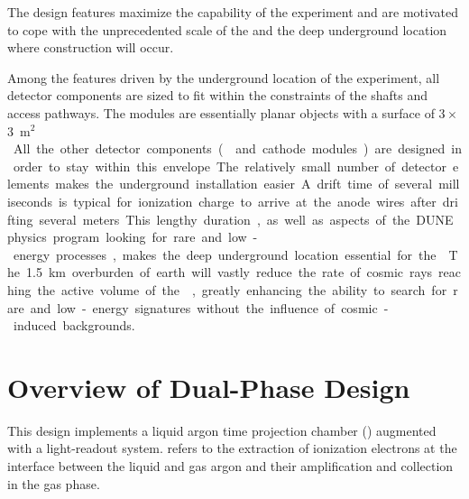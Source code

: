 The \dual design features maximize the capability of the experiment and are motivated to cope with the unprecedented scale of the  and the deep underground location where construction will occur.

Among the features driven by the underground location of the experiment, all detector components are sized to fit within the constraints of the \surf shafts and access pathways. The  modules are essentially planar objects with a surface of \num{3}\,$\times$\,\SI{3}{m$^2$}. All the other detector 
components ( and cathode modules) are  designed in order to stay within this envelope. The relatively small number of detector elements makes the underground installation easier.

A drift time of several milliseconds is typical for ionization charge to arrive at the anode wires after drifting several meters.  This lengthy duration, as well as aspects of the DUNE physics program looking for rare and low-energy processes, makes the deep underground location essential for the .  The \SI{1.5}{km} overburden of earth will vastly reduce the rate of cosmic rays reaching the active volume of the , greatly enhancing the ability to search for rare and low-energy signatures without the influence of cosmic-induced backgrounds.  


\section{Overview of Dual-Phase Design}
\label{sec:dp-execsum-description}

This \dual design implements a \dual liquid argon time projection chamber (\lartpc) augmented with a light-readout system.  \textit{\dual} refers to the extraction of ionization electrons at the interface between the liquid and gas argon and their amplification and collection in the gas phase.

